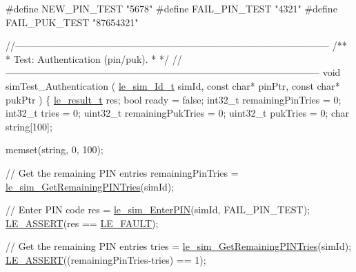 \begin{DoxyCodeInclude}
\textcolor{preprocessor}{#define NEW\_PIN\_TEST        "5678"}
\textcolor{preprocessor}{#define FAIL\_PIN\_TEST       "4321"}
\textcolor{preprocessor}{#define FAIL\_PUK\_TEST       "87654321"}
\end{DoxyCodeInclude}

\begin{DoxyCodeInclude}
\end{DoxyCodeInclude}

\begin{DoxyCodeInclude}
\textcolor{comment}{//--------------------------------------------------------------------------------------------------}\textcolor{comment}{}
\textcolor{comment}{/**}
\textcolor{comment}{ * Test: Authentication (pin/puk).}
\textcolor{comment}{ *}
\textcolor{comment}{ */}
\textcolor{comment}{//--------------------------------------------------------------------------------------------------}
\textcolor{keywordtype}{void} simTest\_Authentication
(
    \hyperlink{le__sim__interface_8h_aace49df88426119626fb1ef4e544ccdd}{le\_sim\_Id\_t} simId,
    \textcolor{keyword}{const} \textcolor{keywordtype}{char}* pinPtr,
    \textcolor{keyword}{const} \textcolor{keywordtype}{char}* pukPtr
)
\{
    \hyperlink{le__basics_8h_a1cca095ed6ebab24b57a636382a6c86c}{le\_result\_t}     res;
    \textcolor{keywordtype}{bool}            ready = \textcolor{keyword}{false};
    int32\_t         remainingPinTries = 0;
    int32\_t         tries = 0;
    uint32\_t        remainingPukTries = 0;
    uint32\_t        pukTries = 0;
    \textcolor{keywordtype}{char}            \textcolor{keywordtype}{string}[100];

    memset(\textcolor{keywordtype}{string}, 0, 100);

    \textcolor{comment}{// Get the remaining PIN entries}
    remainingPinTries = \hyperlink{le__sim__interface_8h_a8886dbb94aa732883ec5a67ddd345f98}{le\_sim\_GetRemainingPINTries}(simId);

    \textcolor{comment}{// Enter PIN code}
    res = \hyperlink{le__sim__interface_8h_ac9cafacb5affb0b531534e3fc547ebd2}{le\_sim\_EnterPIN}(simId, FAIL\_PIN\_TEST);
    \hyperlink{le__log_8h_ac0dbbef91dc0fed449d0092ff0557b39}{LE\_ASSERT}(res == \hyperlink{le__basics_8h_a1cca095ed6ebab24b57a636382a6c86cac409634423b6b1ef09643529f6224798}{LE\_FAULT});

    \textcolor{comment}{// Get the remaining PIN entries}
    tries = \hyperlink{le__sim__interface_8h_a8886dbb94aa732883ec5a67ddd345f98}{le\_sim\_GetRemainingPINTries}(simId);
    \hyperlink{le__log_8h_ac0dbbef91dc0fed449d0092ff0557b39}{LE\_ASSERT}((remainingPinTries-tries) == 1);


\end{DoxyCodeInclude}
